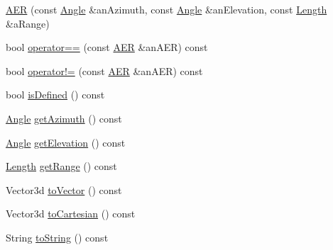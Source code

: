 \begin{DoxyCompactItemize}
\item 
\hyperlink{classostk_1_1physics_1_1coord_1_1spherical_1_1_a_e_r_a5a2c1c2f258741242751790d8f540a27}{A\+ER} (const \hyperlink{classostk_1_1physics_1_1units_1_1_angle}{Angle} \&an\+Azimuth, const \hyperlink{classostk_1_1physics_1_1units_1_1_angle}{Angle} \&an\+Elevation, const \hyperlink{classostk_1_1physics_1_1units_1_1_length}{Length} \&a\+Range)
\item 
bool \hyperlink{classostk_1_1physics_1_1coord_1_1spherical_1_1_a_e_r_ae076f893514b011e468f56391cd5175e}{operator==} (const \hyperlink{classostk_1_1physics_1_1coord_1_1spherical_1_1_a_e_r}{A\+ER} \&an\+A\+ER) const
\item 
bool \hyperlink{classostk_1_1physics_1_1coord_1_1spherical_1_1_a_e_r_aaaf68f74d98ae598888632d84e0d854b}{operator!=} (const \hyperlink{classostk_1_1physics_1_1coord_1_1spherical_1_1_a_e_r}{A\+ER} \&an\+A\+ER) const
\item 
bool \hyperlink{classostk_1_1physics_1_1coord_1_1spherical_1_1_a_e_r_a1cec95b271aeb27ed9c064010d21d9c3}{is\+Defined} () const
\item 
\hyperlink{classostk_1_1physics_1_1units_1_1_angle}{Angle} \hyperlink{classostk_1_1physics_1_1coord_1_1spherical_1_1_a_e_r_a8262eebc76c901f3a83cab7cc5e23e59}{get\+Azimuth} () const
\item 
\hyperlink{classostk_1_1physics_1_1units_1_1_angle}{Angle} \hyperlink{classostk_1_1physics_1_1coord_1_1spherical_1_1_a_e_r_a788dc7a222c98d7a9b0f169edcb55140}{get\+Elevation} () const
\item 
\hyperlink{classostk_1_1physics_1_1units_1_1_length}{Length} \hyperlink{classostk_1_1physics_1_1coord_1_1spherical_1_1_a_e_r_adfb98c3f3063b10b01b96202e1a2c33d}{get\+Range} () const
\item 
Vector3d \hyperlink{classostk_1_1physics_1_1coord_1_1spherical_1_1_a_e_r_a3e9dcb6254a0af5fac07892be8ff6706}{to\+Vector} () const
\item 
Vector3d \hyperlink{classostk_1_1physics_1_1coord_1_1spherical_1_1_a_e_r_abf4ebb53ce580177b48ea619feaf2a55}{to\+Cartesian} () const
\item 
String \hyperlink{classostk_1_1physics_1_1coord_1_1spherical_1_1_a_e_r_ac65d7723e4bec5d1a4ca5a4e7c311050}{to\+String} () const
\end{DoxyCompactItemize}
